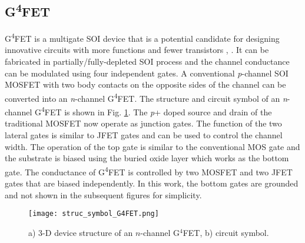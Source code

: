 \documentclass[conference]{IEEEtran}
\begin{document}
\subsection{G\textsuperscript4FET}
 G\textsuperscript4FET is a multigate SOI device \cite{blalock2002multiple} that is a potential candidate for designing innovative circuits with more functions and fewer transistors \cite{akarvardar2006four}, \cite{akarvardar2005novel}. It can be fabricated in partially/fully-depleted SOI process and the channel conductance can be modulated using four independent gates\cite{dufrene2004investigation}. 
 A conventional \textit{p}-channel SOI MOSFET with two body contacts on the opposite sides of the channel can be converted into an \textit{n}-channel G\textsuperscript4FET. The structure and circuit symbol of an \textit{n}-channel G\textsuperscript4FET is shown in Fig. \ref{fig:G4FET_struc}. The \textit{p}+ doped source and drain of the traditional MOSFET now operate as junction gates. The function of the two lateral gates is similar to JFET gates and can be used to control the channel width. The operation of the top gate is similar to the conventional MOS gate and the substrate is biased using the buried oxide layer which works as the bottom gate. The conductance of G\textsuperscript4FET is controlled by two MOSFET and two JFET gates that are biased independently. In this work, the bottom gates are grounded and not shown in the subsequent figures for simplicity. 
 
 
 \begin{figure}
   \centering
   \texttt{[image: struc\_symbol\_G4FET.png]}
   \setlength\belowcaptionskip{-15.0pt}
    \caption{\small{a) 3-D device structure of an $n$-channel G$^4$FET, b) circuit symbol.}}
    \label{fig:G4FET_struc}
\end{figure}
\end{document}
